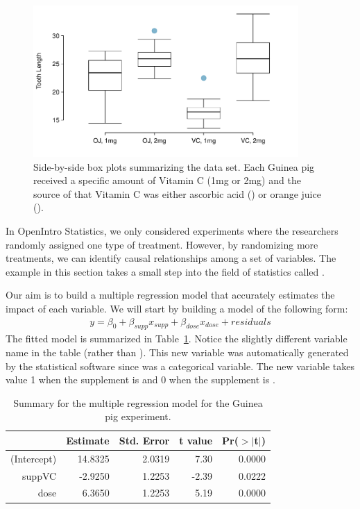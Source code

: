 \begin{figure}[h]
\centering
\includegraphics[width=0.9\textwidth]{RegressionExtras/figures/interaction/interaction}
\caption{Side-by-side box plots summarizing the  data set. Each Guinea pig received a specific amount of Vitamin C (1mg or 2mg) and the source of that Vitamin C was either ascorbic acid () or orange juice ().}
\label{interaction}
\end{figure}

\begin{tipBox}{
In OpenIntro Statistics, we only considered experiments where the researchers randomly assigned one type of treatment. However, by randomizing more treatments, we can identify causal relationships among a set of variables. The example in this section takes a small step into the field of statistics called .}
\end{tipBox}



Our aim is to build a multiple regression model that accurately estimates the impact of each variable. We will start by building a model of the following form:
\begin{align*}
y = \beta_0 + \beta_{supp}x_{supp} + \beta_{dose}x_{dose} + residuals
\end{align*}
The fitted model is summarized in Table~\ref{interaction-simpleModelSummary}. Notice the slightly different variable name  in the table (rather than ). This new  variable was automatically generated by the statistical software since  was a categorical variable. The new variable takes value 1 when the supplement is  and 0 when the supplement is .
\begin{table}
\centering
\begin{tabular}{rrrrr}
  \hline
 & Estimate & Std. Error & t value & Pr($>$$|$t$|$) \\ 
  \hline
(Intercept) & 14.8325 & 2.0319 & 7.30 & 0.0000 \\ 
  suppVC & -2.9250 & 1.2253 & -2.39 & 0.0222 \\ 
  dose & 6.3650 & 1.2253 & 5.19 & 0.0000 \\ 
   \hline
\end{tabular}
\caption{Summary for the multiple regression model for the Guinea pig experiment.}
\label{interaction-simpleModelSummary}
\end{table}

